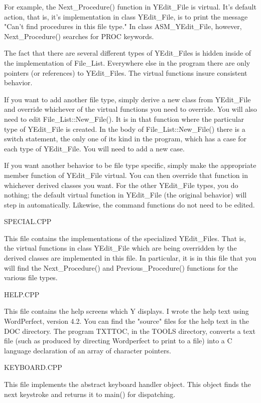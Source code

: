 For example, the Next\_Procedure() function in YEdit\_File is virtual. It's default action, that
is, it's implementation in class YEdit\_File, is to print the message "Can't find procedures in
this file type." In class ASM\_YEdit\_File, however, Next\_Procedure() searches for PROC keywords.

The fact that there are several different types of YEdit\_Files is hidden inside of the
implementation of File\_List. Everywhere else in the program there are only pointers (or
references) to YEdit\_Files. The virtual functions insure consistent behavior.

If you want to add another file type, simply derive a new class from YEdit\_File and override
whichever of the virtual functions you need to override. You will also need to edit
File\_List::New\_File(). It is in that function where the particular type of YEdit\_File is
created. In the body of File\_List::New\_File() there is a switch statement, the only one of its
kind in the program, which has a case for each type of YEdit\_File. You will need to add a new
case.

If you want another behavior to be file type specific, simply make the appropriate member
function of YEdit\_File virtual. You can then override that function in whichever derived classes
you want. For the other YEdit\_File types, you do nothing; the default virtual function in
YEdit\_File (the original behavior) will step in automatically. Likewise, the command functions
do not need to be edited.

SPECIAL.CPP

This file contains the implementations of the specialized YEdit\_Files. That is, the virtual
functions in class YEdit\_File which are being overridden by the derived classes are implemented
in this file. In particular, it is in this file that you will find the Next\_Procedure() and
Previous\_Procedure() functions for the various file types.

HELP.CPP

This file contains the help screens which Y displays. I wrote the help text using WordPerfect,
version 4.2. You can find the "source" files for the help text in the DOC directory. The program
TXTTOC, in the TOOLS directory, converts a text file (such as produced by directing Wordperfect
to print to a file) into a C language declaration of an array of character pointers.

KEYBOARD.CPP

This file implements the abstract keyboard handler object. This object finds the next keystroke
and returns it to main() for dispatching.

